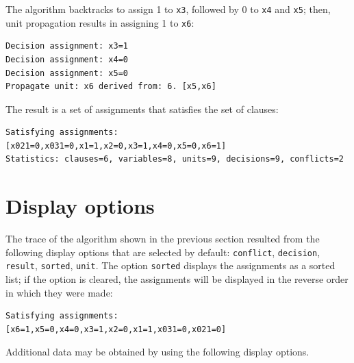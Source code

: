 \documentclass[11pt]{report}
\newcommand*{\p}[1]{\textup{\texttt{#1}}}
\begin{document}
The algorithm backtracks to assign 1 to \p{x3}, followed by 0 to \p{x4}
and \p{x5}; then, unit propagation results in assigning 1 to \p{x6}:

\begin{verbatim}
Decision assignment: x3=1
Decision assignment: x4=0
Decision assignment: x5=0
Propagate unit: x6 derived from: 6. [x5,x6]
\end{verbatim}

The result is a set of assignments that satisfies the set of clauses:

\begin{verbatim}
Satisfying assignments:
[x021=0,x031=0,x1=1,x2=0,x3=1,x4=0,x5=0,x6=1]
Statistics: clauses=6, variables=8, units=9, decisions=9, conflicts=2
\end{verbatim}

\newpage

\section{Display options}

The trace of the algorithm shown in the previous section resulted from
the following display options that are selected by default:
\p{conflict}, \p{decision}, \p{result}, \p{sorted}, \p{unit}. The option
\p{sorted} displays the assignments as a sorted list; if the option is
cleared, the assignments will be displayed in the reverse order in which
they were made:

\begin{verbatim}
Satisfying assignments:
[x6=1,x5=0,x4=0,x3=1,x2=0,x1=1,x031=0,x021=0]
\end{verbatim}

Additional data may be obtained by using the following display options.
\end{document}
